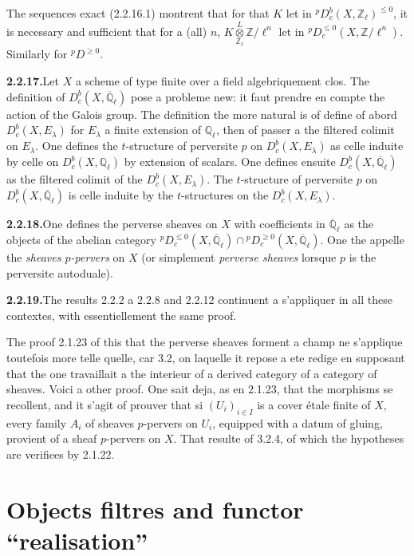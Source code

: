\documentclass[12pt,a4paper]{article}
\theoremstyle{plain}
\theoremstyle{definition}
\begin{document}
The sequences exact (2.2.16.1) montrent that for that $K$ let in ${}^p D_c^b(X, \mathbb{Z}_\ell)^{\leqslant 0}$, it is necessary and sufficient that for a (all) $n$, $K \overset{L}{\underset{\mathbb{Z}_\ell}{\otimes}} \mathbb{Z}/\ell^n$ let in ${}^p D_c^{\leqslant 0}(X, \mathbb{Z}/\ell^n)$. Similarly for ${}^p D^{\geqslant 0}$.

\smallskip
\noindent\textbf{2.2.17.}\quad Let $X$ a scheme of type finite over a field algebriquement clos. The definition of $D_c^b(X, \overline{\mathbb{Q}}_\ell)$ pose a probleme new: it faut prendre en compte the action of the Galois group. The definition the more natural is of define of abord $D_c^b(X, E_\lambda)$ for $E_\lambda$ a finite extension of $\mathbb{Q}_\ell$, then of passer a the filtered colimit on $E_\lambda$. One defines the $t$-structure of perversite $p$ on $D_c^b(X, E_\lambda)$ as celle induite by celle on $D_c^b(X, \mathbb{Q}_\ell)$ by extension of scalars. One defines ensuite $D_c^b(X, \overline{\mathbb{Q}}_\ell)$ as the filtered colimit of the $D_c^b(X, E_\lambda)$. The $t$-structure of perversite $p$ on $D_c^b(X, \overline{\mathbb{Q}}_\ell)$ is celle induite by the $t$-structures on the $D_c^b(X, E_\lambda)$.

\smallskip
\noindent\textbf{2.2.18.}\quad One defines the perverse sheaves on $X$ with coefficients in $\overline{\mathbb{Q}}_\ell$ as the objects of the abelian category ${}^p D_c^{\leqslant 0}(X, \overline{\mathbb{Q}}_\ell) \cap {}^p D_c^{\geqslant 0}(X, \overline{\mathbb{Q}}_\ell)$. One the appelle the \emph{sheaves $p$-pervers} on $X$ (or simplement \emph{perverse sheaves} lorsque $p$ is the perversite autoduale).

\smallskip
\noindent\textbf{2.2.19.}\quad The results 2.2.2 a 2.2.8 and 2.2.12 continuent a s'appliquer in all these contextes, with essentiellement the same proof.

The proof 2.1.23 of this that the perverse sheaves forment a champ ne s'applique toutefois more telle quelle, car 3.2, on laquelle it repose a ete redige en supposant that the one travaillait a the interieur of a derived category of a category of sheaves. Voici a other proof. One sait deja, as en 2.1.23, that the morphisms se recollent, and it s'agit of prouver that si $(U_i)_{i \in I}$ is a cover étale finite of $X$, every family $A_i$ of sheaves $p$-pervers on $U_i$, equipped with a datum of gluing, provient of a sheaf $p$-pervers on $X$. That resulte of 3.2.4, of which the hypotheses are verifiees by 2.1.22.

\section{Objects filtres and functor ``realisation''}
\end{document}
